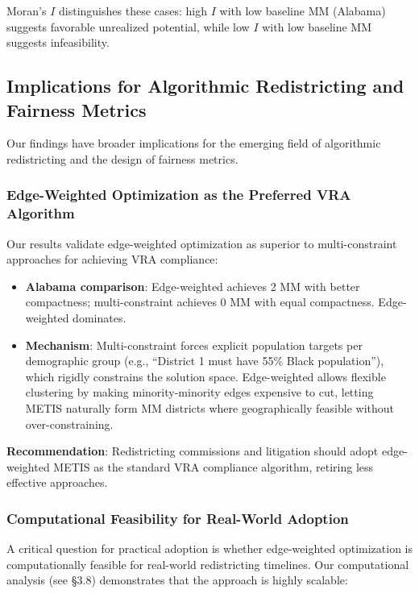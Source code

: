 Moran's $I$ distinguishes these cases: high $I$ with low baseline MM (Alabama) suggests favorable unrealized potential, while low $I$ with low baseline MM suggests infeasibility.

\subsection{Implications for Algorithmic Redistricting and Fairness Metrics}

Our findings have broader implications for the emerging field of algorithmic redistricting and the design of fairness metrics.

\subsubsection{Edge-Weighted Optimization as the Preferred VRA Algorithm}

Our results validate edge-weighted optimization as superior to multi-constraint approaches for achieving VRA compliance:
\begin{itemize}
    \item \textbf{Alabama comparison}: Edge-weighted achieves 2 MM with better compactness; multi-constraint achieves 0 MM with equal compactness. Edge-weighted dominates.
    \item \textbf{Mechanism}: Multi-constraint forces explicit population targets per demographic group (e.g., ``District 1 must have 55\% Black population''), which rigidly constrains the solution space. Edge-weighted allows flexible clustering by making minority-minority edges expensive to cut, letting METIS naturally form MM districts where geographically feasible without over-constraining.
\end{itemize}

\textbf{Recommendation}: Redistricting commissions and litigation should adopt edge-weighted METIS as the standard VRA compliance algorithm, retiring less effective approaches.

\subsubsection{Computational Feasibility for Real-World Adoption}

A critical question for practical adoption is whether edge-weighted optimization is computationally feasible for real-world redistricting timelines. Our computational analysis (see §3.8) demonstrates that the approach is highly scalable:

